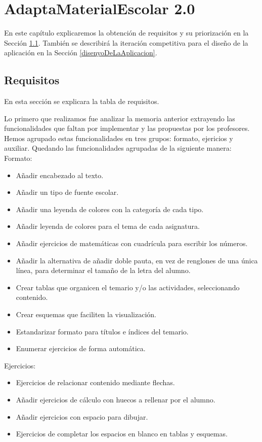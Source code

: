 \chapter{AdaptaMaterialEscolar 2.0}
\label{cap:AdaptaMaterialEscolar2.0}
En este capítulo explicaremos la obtención de requisitos y su priorización en la Sección \ref{cap:requisitos}. También se describirá la iteración competitiva para el diseño de la aplicación en la Sección \ref{disenyoDeLaAplicacion}.

\section{Requisitos}
\label{cap:requisitos}
En esta sección se explicara la tabla de requisitos.

Lo primero que realizamos fue analizar la memoria anterior extrayendo las funcionalidades que faltan por implementar y las propuestas por los profesores. Hemos agrupado estas funcionalidades en tres grupos: formato, ejericios y auxiliar. Quedando las funcionalidades agrupadas de la siguiente manera:
Formato: 
\begin{itemize}
  \item Añadir encabezado al texto.
  \item Añadir un tipo de fuente escolar.
  \item Añadir una leyenda de colores con la categoría de cada tipo.
  \item Añadir leyenda de colores para el tema de cada asignatura.
  \item Añadir ejercicios de matemáticas con cuadrícula para escribir los números.
  \item Añadir la alternativa de añadir doble pauta, en vez de renglones de una única línea, para determinar el tamaño de la letra del alumno.
  \item Crear tablas que organicen el temario y/o las actividades, seleccionando contenido.
  \item Crear esquemas que faciliten la visualización.
  \item Estandarizar formato para títulos e índices del temario.
  \item Enumerar ejercicios de forma automática.
\end{itemize}
Ejercicios:
\begin{itemize}
  \item Ejercicios de relacionar contenido mediante flechas.
  \item Añadir ejercicios de cálculo con huecos a rellenar por el alumno.
  \item Añadir ejercicios con espacio para dibujar.
  \item Ejercicios de completar los espacios en blanco en tablas y esquemas.
\end{itemize}

